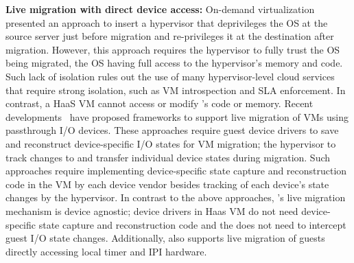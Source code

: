 {\bf Live migration with direct device access:} 
On-demand virtualization~\cite{ondemand} presented an approach
to insert a hypervisor that deprivileges the OS at the 
source server just before migration and re-privileges it
at the destination after migration. However, this approach 
requires the hypervisor to fully trust the OS being migrated, 
the OS having full access to the hypervisor's memory and code.
Such lack of isolation rules out the use of many hypervisor-level
cloud services that require strong isolation, such as VM introspection
and SLA enforcement. In contrast, a HaaS VM 
cannot access or modify \sna's code or memory.
Recent developments~\cite{vfio-live-migration,blmvisor-journal} 
have proposed frameworks to support live migration 
of VMs using passthrough I/O devices. These approaches 
require guest device drivers to save and reconstruct device-specific 
I/O states for VM migration; the hypervisor to track changes to
and transfer individual device states during migration.
Such approaches require
implementing device-specific state capture and reconstruction code 
in the VM by each device vendor besides tracking of each device's
state changes by the hypervisor. 
In contrast to the above approaches, 
\sna's live migration mechanism is device agnostic; 
device drivers in Haas VM do not need
device-specific state capture and reconstruction code 
and the \na does not need to intercept guest I/O state changes.
Additionally, \na also supports live migration of guests 
directly accessing local timer and IPI hardware.


